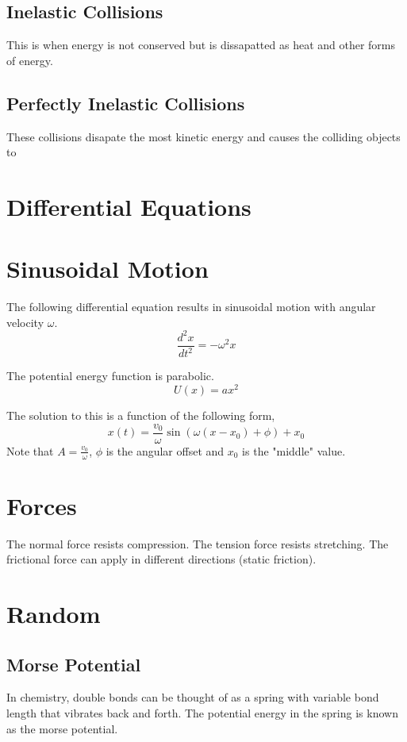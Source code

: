 \documentclass{article}
\begin{document}
    \subsection{Inelastic Collisions}
        This is when energy is not conserved but is dissapatted as heat and other forms of energy.

    \subsection{Perfectly Inelastic Collisions}
        These collisions disapate the most kinetic energy and causes the colliding objects to

\section{Differential Equations}
    \section{Sinusoidal Motion}
        The following differential equation results in sinusoidal motion with angular velocity $\omega$.
        $$\frac{d^{2}x}{dt^{2}}=-\omega^{2}x$$

        The potential energy function is parabolic.
        $$U(x)=ax^{2}$$

        The solution to this is a function of the following form,
        $$x(t)=\frac{v_{0}}{\omega}\sin(\omega (x-x_{0})+\phi)+x_{0}$$
        Note that $A=\frac{v_{0}}{\omega}$, $\phi$ is the angular offset and $x_{0}$ is the "middle" value.

\section{Forces}
    The normal force resists compression. The tension force resists stretching. The frictional force can apply in
    different directions (static friction).

\section{Random}
    \subsection{Morse Potential}
        In chemistry, double bonds can be thought of as a spring with variable bond length that vibrates back
        and forth. The potential energy in the spring is known as the morse potential.
\end{document}
